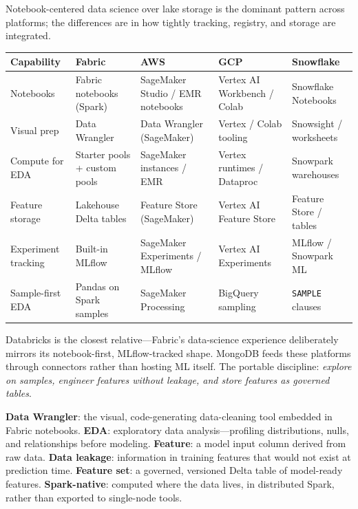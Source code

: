 \begin{crosscloud}
Notebook-centered data science over lake storage is the dominant pattern across platforms; the differences are in how tightly tracking, registry, and storage are integrated.

\vspace{2mm}
{\footnotesize
\begin{tabular}{@{}p{2.8cm}p{3.2cm}p{3.2cm}p{3.2cm}p{3.2cm}@{}}
\toprule
\textbf{Capability} & \textbf{Fabric} & \textbf{AWS} & \textbf{GCP} & \textbf{Snowflake} \\
\midrule
Notebooks & Fabric notebooks (Spark) & SageMaker Studio / EMR notebooks & Vertex AI Workbench / Colab & Snowflake Notebooks \\
Visual prep & Data Wrangler & Data Wrangler (SageMaker) & Vertex / Colab tooling & Snowsight / worksheets \\
Compute for EDA & Starter pools + custom pools & SageMaker instances / EMR & Vertex runtimes / Dataproc & Snowpark warehouses \\
Feature storage & Lakehouse Delta tables & Feature Store (SageMaker) & Vertex AI Feature Store & Feature Store / tables \\
Experiment tracking & Built-in MLflow & SageMaker Experiments / MLflow & Vertex AI Experiments & MLflow / Snowpark ML \\
Sample-first EDA & Pandas on Spark samples & SageMaker Processing & BigQuery sampling & \texttt{SAMPLE} clauses \\
\bottomrule
\end{tabular}}

\vspace{1mm}
Databricks is the closest relative---Fabric's data-science experience deliberately mirrors its notebook-first, MLflow-tracked shape. MongoDB feeds these platforms through connectors rather than hosting ML itself. The portable discipline: \emph{explore on samples, engineer features without leakage, and store features as governed tables}.
\end{crosscloud}

\begin{keyterms}
\textbf{Data Wrangler}: the visual, code-generating data-cleaning tool embedded in Fabric notebooks. \quad
\textbf{EDA}: exploratory data analysis---profiling distributions, nulls, and relationships before modeling. \quad
\textbf{Feature}: a model input column derived from raw data. \quad
\textbf{Data leakage}: information in training features that would not exist at prediction time. \quad
\textbf{Feature set}: a governed, versioned Delta table of model-ready features. \quad
\textbf{Spark-native}: computed where the data lives, in distributed Spark, rather than exported to single-node tools.
\end{keyterms}

